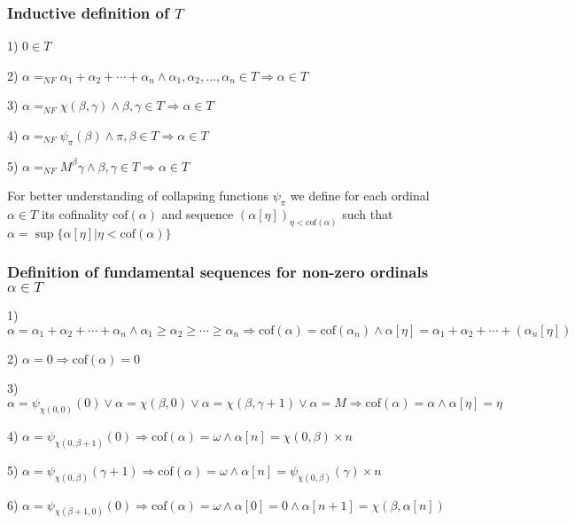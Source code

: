 \documentclass[10pt]{article}
\begin{document}
\subsubsection{Inductive definition of \(T\)}

1) \(0 \in T\)

2) \(\alpha=_{NF}\alpha_1+\alpha_2+\cdots+\alpha_n\wedge\alpha_1,\alpha_2,...,\alpha_n\in T\Rightarrow\alpha\in T\)

3) \(\alpha=_{NF}\chi(\beta,\gamma)\wedge\beta,\gamma\in T\Rightarrow\alpha\in T\)

4) \(\alpha=_{NF}\psi_\pi(\beta)\wedge\pi,\beta\in T\Rightarrow\alpha\in T\)

5) \(\alpha=_{NF}M^\beta\gamma\wedge\beta,\gamma\in T\Rightarrow\alpha\in T\)

For better understanding of collapsing functions \(\psi_\pi\) we define for each ordinal  \(\alpha\in T\)  its cofinality \(\text{cof}(\alpha) \) and  sequence   \( (\alpha[\eta])_{\eta<\text{cof}(\alpha) }\)  such that \(\alpha=\sup\{\alpha[\eta]|\eta<\text{cof}(\alpha) \}\)

\subsubsection{Definition of fundamental sequences for non-zero ordinals \(\alpha\in T\)}

1) \(\alpha=\alpha_1+\alpha_2+\cdots+\alpha_n \wedge \alpha_1\geq\alpha_2\geq\cdots\geq\alpha_n \Rightarrow \text{cof} (\alpha)= \text{cof} (\alpha_n) \wedge \alpha[\eta]=\alpha_1+\alpha_2+\cdots+(\alpha_n[\eta])\)

2) \(\alpha=0\Rightarrow\text{cof}(\alpha)=0\) 

\bigskip

3) \(\alpha=\psi _{\chi(0,0)}(0) \vee \alpha=\chi(\beta,0) \vee \alpha=\chi(\beta,\gamma+1) \vee \alpha=M\Rightarrow \text{cof} (\alpha)=\alpha \wedge \alpha[\eta]=\eta\)

4) \(\alpha=\psi _{\chi(0,\beta+1)}(0) \Rightarrow \text{cof}(\alpha)=\omega \wedge \alpha[n]=\chi(0,\beta)\times n\)

5) \(\alpha=\psi_{ \chi(0,\beta)}(\gamma+1) \Rightarrow \text{cof}(\alpha)=\omega \wedge \alpha[n]=\psi_{\chi(0,\beta)}(\gamma)\times n\)

\bigskip

6) \(\alpha=\psi _{\chi(\beta+1,0)}(0) \Rightarrow \text{cof}(\alpha)=\omega \wedge \alpha[0]=0 \wedge \alpha[n+1]=\chi(\beta,\alpha[n])\)
\end{document}
